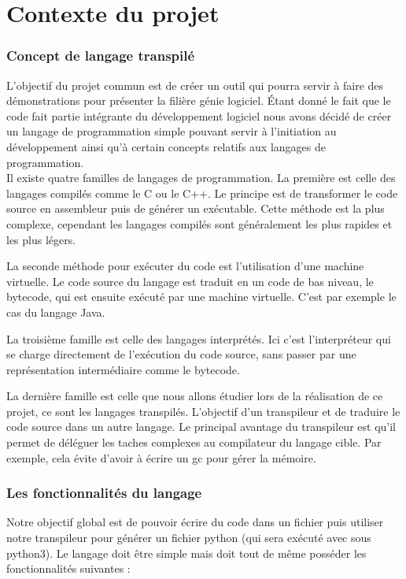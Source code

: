 \documentclass[a4paper]{article}%
\begin{document}
\part{Contexte du projet}

\section{Concept de langage transpilé}

L'objectif du projet commun est de créer un outil qui pourra servir à faire des
démonstrations pour présenter la filière génie logiciel. Étant donné le fait que
le code fait partie intégrante du développement logiciel nous avons décidé de
créer un langage de programmation simple pouvant servir à l'initiation au
développement ainsi qu'à certain concepts relatifs aux langages de
programmation.\\

Il existe quatre familles de langages de programmation. La première est celle
des langages compilés comme le C ou le C++. Le principe est de transformer le
code source en assembleur puis de générer un exécutable. Cette méthode est la
plus complexe, cependant les langages compilés sont généralement les plus
rapides et les plus légers.

La seconde méthode pour exécuter du code est l'utilisation d'une machine
virtuelle. Le code source du langage est traduit en un code de bas niveau, le
\gls{bytecode}, qui est ensuite exécuté par une machine virtuelle. C'est par exemple
le cas du langage Java.

La troisième famille est celle des langages interprétés. Ici c'est
l'interpréteur qui se charge directement de l'exécution du code source, sans
passer par une représentation intermédiaire comme le \gls{bytecode}.

La dernière famille est celle que nous allons étudier lors de la réalisation de
ce projet, ce sont les langages transpilés. L'objectif d'un transpileur et de
traduire le code source dans un autre langage. Le principal avantage du
transpileur est qu'il permet de déléguer les taches complexes au compilateur du
langage cible. Par exemple, cela évite d'avoir à écrire un \gls{gc} pour gérer
la mémoire.

\section{Les fonctionnalités du langage}

Notre objectif global est de pouvoir écrire du code dans un fichier puis
utiliser notre transpileur pour générer un fichier python (qui sera exécuté avec
sous python3). Le langage doit être simple mais doit tout de même posséder les
fonctionnalités suivantes :
\end{document}
